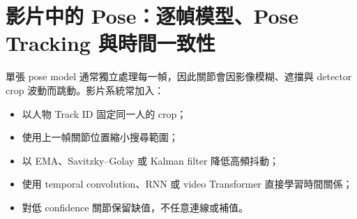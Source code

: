 \documentclass[11pt,a4paper,oneside]{report}
\begin{document}
\section{影片中的 Pose：逐幀模型、Pose Tracking 與時間一致性}

單張 pose model 通常獨立處理每一幀，因此關節會因影像模糊、遮擋與 detector crop 波動而跳動。影片系統常加入：
\begin{itemize}
  \item 以人物 Track ID 固定同一人的 crop；
  \item 使用上一幀關節位置縮小搜尋範圍；
  \item 以 EMA、Savitzky--Golay 或 Kalman filter 降低高頻抖動；
  \item 使用 temporal convolution、RNN 或 video Transformer 直接學習時間關係；
  \item 對低 confidence 關節保留缺值，不任意連線或補值。
\end{itemize}
\end{document}
